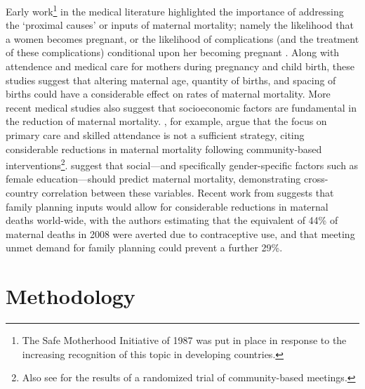 \documentclass{article}[12pt,subeqn]
\begin{document}
\begin{spacing}{1.4}
Early work\footnote{The Safe Motherhood Initiative of 1987 was put in place in response to the increasing recognition 
of this topic in developing countries.} in the medical literature highlighted the importance of addressing the 
`proximal causes' or inputs of maternal mortality; namely the likelihood that a women becomes pregnant, or the likelihood 
of complications (and the treatment of these complications) conditional upon her becoming pregnant \citep{MccarthyMaine1992, 
GoodburnCampbell2001, TrusselPebley1984}.  Along with attendence and medical care for mothers during pregnancy and child 
birth, these studies suggest that altering maternal age, quantity of births, and spacing of births could have a considerable 
effect on rates of maternal mortality.  More recent medical studies also  suggest that socioeconomic factors are 
fundamental in the reduction of maternal mortality.  \citet{Costelloetal2004}, for example, argue that the focus 
on primary care and skilled attendance is not a sufficient strategy, citing considerable reductions in maternal mortality 
following community-based interventions\footnote{Also see \citet{Manandharetal2004} for the results of a randomized trial of 
community-based meetings.}.  \citet{McAlisterBaskett2006} suggest that social---and specifically gender-specific factors 
such as female education---should predict maternal mortality, demonstrating cross-country correlation between these 
variables.  Recent work from \citet{Ahmedetal2012} suggests that family planning inputs would allow for considerable
reductions in maternal deaths world-wide, with the authors estimating that the equivalent of 44\% of maternal deaths 
in 2008 were averted due to contraceptive use, and that meeting unmet demand for family planning could prevent a further 29\%.

\section{Methodology}

\end{spacing}
\end{document}
